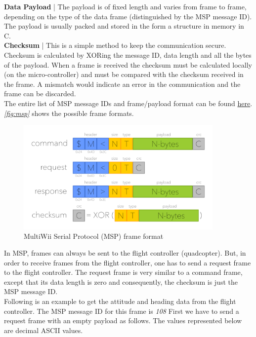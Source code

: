 \documentclass[a4paper,12pt,oneside]{book}
\begin{document}
\textbf{Data Payload} | The payload is of fixed length and varies from frame to frame, depending on the type of the data frame (distinguished by the MSP message ID). The payload is usually packed and stored in the form a structure in memory in C.\\

\textbf{Checksum} | This is a simple method to keep the communication secure. Checksum is calculated by XORing the message ID, data length and all the bytes of the payload. When a frame is received the checksum must be calculated locally (on the micro-controller) and must be compared with the checksum received in the frame. A mismatch would indicate an error in the communication and the frame can be discarded.\\

The entire list of MSP message IDs and frame/payload format can be found \href{http://www.multiwii.com/wiki/index.php?title=Multiwii_Serial_Protocol}{here}. \textit{\autoref{fig:msp}} shows the possible frame formats.

\clearpage

\begin{figure}[!htb]
\centering
\includegraphics[width=0.9\textwidth]{images/msp_frame}
\caption{MultiWii Serial Protocol (MSP) frame format}
\label{fig:msp}
\end{figure}

\bigskip

In MSP, frames can always be sent to the flight controller (quadcopter). But, in order to receive frames from the flight controller, one has to send a request frame to the flight controller. The request frame is very similar to a command frame, except that its data length is zero and consequently, the checksum is just the MSP message ID.\\

Following is an example to get the attitude and heading data from the flight controller. The MSP message ID for this frame is \textit{108} First we have to send a request frame with an empty payload as follows. The values represented below are decimal ASCII values.\\
\end{document}
